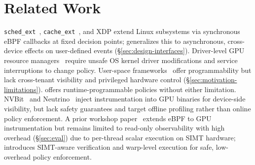 \section{Related Work}
\label{sec:related}


\texttt{sched\_ext}~\cite{schedext-docs}, \texttt{cache\_ext}~\cite{zussman2025cache_ext}, and XDP extend Linux subsystems via synchronous eBPF callbacks at fixed decision points; \sys generalizes this to asynchronous, cross-device effects on user-defined events (\S\ref{sec:design-interfaces}). Driver-level GPU resource managers~\cite{kato2011timegraph,kato2012gdev,kernelintercept,fan2025gpreempt,wang2024gcaps,coppock2025lithos} require unsafe OS kernel driver modifications and service interruptions to change policy. User-space frameworks~\cite{ng2023paella,shen2025xsched,gim2025pie,chen2025ktransformers} offer programmability but lack cross-tenant visibility and privileged hardware control (\S\ref{sec:motivation-limitations}). \sys offers runtime-programmable policies without either limitation.
NVBit~\cite{villa2019nvbit} and Neutrino~\cite{neutrino} inject instrumentation into GPU binaries for device-side visibility, but lack safety guarantees and target offline profiling rather than online policy enforcement. A prior workshop paper~\cite{egpu} extends eBPF to GPU instrumentation but remains limited to read-only observability with high overhead (\S\ref{sec:eval}) due to per-thread scalar execution on SIMT hardware; \sys introduces SIMT-aware verification and warp-level execution for safe, low-overhead policy enforcement.
